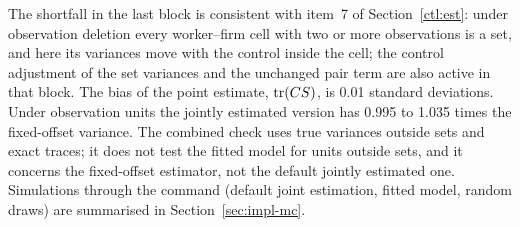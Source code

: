 The shortfall in the last block is consistent with item~7 of Section~\ref{ctl:est}: under
observation deletion every worker--firm cell with two or more observations is a set, and here its variances move
with the control inside the cell; the control adjustment of the set variances and the unchanged pair term are also
active in that block. The bias of the point estimate, $\operatorname{tr}(CS)$, is 0.01 standard deviations. Under observation
units the jointly estimated version has 0.995 to 1.035 times the fixed-offset variance. The combined check uses
true variances outside sets and exact traces; it does not test the fitted model for units outside sets, and it
concerns the fixed-offset estimator, not the default jointly estimated one. Simulations through the command
(default joint estimation, fitted model, random draws) are summarised in Section~\ref{sec:impl-mc}.

